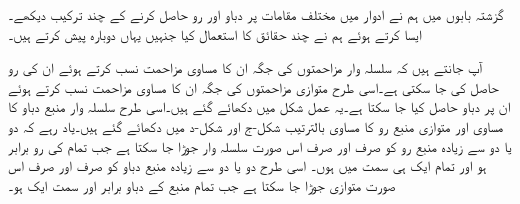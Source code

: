 گزشتہ بابوں میں ہم نے ادوار میں مختلف مقامات پر دباو اور رو حاصل کرنے کے چند ترکیب دیکھے۔ایسا کرتے ہوئے ہم نے چند حقائق کا استعمال کیا جنہیں یہاں دوبارہ پیش کرتے ہیں۔

آپ جانتے ہیں کہ سلسلہ وار مزاحمتوں  کی جگہ ان کا مساوی مزاحمت نسب کرتے ہوئے ان کی رو حاصل کی جا سکتی ہے۔اسی طرح متوازی مزاحمتوں کی جگہ ان کا مساوی مزاحمت نسب کرتے ہوئے ان  پر دباو حاصل کیا جا سکتا ہے۔یہ عمل شکل  میں دکھائے گئے ہیں۔اسی طرح سلسلہ وار منبع دباو کا مساوی اور متوازی منبع رو کا مساوی بالترتیب شکل-ج اور شکل-د میں دکھائے گئے ہیں۔یاد رہے کہ دو یا دو سے زیادہ منبع رو کو صرف اور صرف اس صورت سلسلہ وار جوڑا جا سکتا ہے جب تمام کی رو برابر ہو اور تمام  ایک ہی سمت میں ہوں۔ اسی طرح دو یا دو سے زیادہ منبع دباو کو صرف اور صرف اس صورت متوازی جوڑا جا سکتا ہے جب تمام منبع کے دباو برابر اور سمت ایک ہو۔

